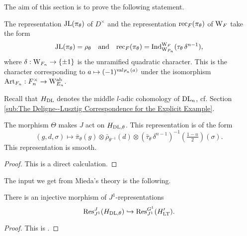 \documentclass[../main.tex]{subfiles}
\begin{document}
The aim of this section is to prove the following statement.
\begin{thm}\label{thm:MainRes1}
  The representation $\mathrm{JL}(\pi_\theta)$ of $D^\times$ and the representation
  $\mathrm{rec}_F(\pi_\theta)$ of $\mathrm W_F$ take the form
  \begin{equation*}
    \mathrm{JL}(\pi_\theta) = \rho_{\theta}
    \quad \text{and} \quad \mathrm{rec}_F(\pi_\theta) = \mathrm{Ind}_{\mathrm W_{F_n}}^{\mathrm W_F} 
    (\tau_\theta \, \delta^{n-1}),
  \end{equation*}
  where $\delta: \mathrm W_{F_n} \to \{\pm 1\}$ is the unramified quadratic
  character. This is the character corresponding to $a \mapsto
  (-1)^{\mathrm{val}_{F_n}(a)}$ under the isomorphism $\mathrm{Art}_{F_n}: F_n^\times \to
  \mathrm W_{E_n}^{\mathrm{ab}}$. 
\end{thm}


Recall that $H_{\mathrm{DL}}$ denotes the middle $l$-adic cohomology of 
$\mathrm{DL}_n$, cf. Section \ref{sub:The Deligne--Lusztig Correspondence for the
Explicit Example}.
\begin{lem}
  The morphism $\Theta$ makes $J$ act on ${H}_{\mathrm{DL},\theta}$. This representation is 
  of the form 
  \begin{equation*}
    (g,d,\sigma) \mapsto \bar \pi_\theta(g) \otimes \bar \rho_{\theta^{-1}}(d)
    \otimes \left(\bar \tau_\theta \, \delta^{n-1}\right)^{-1}(\tfrac{1-n}2)(\sigma).
  \end{equation*}
  This representation is smooth.
\begin{proof}
  This is a direct calculation.
\end{proof}
\end{lem}

The input we get from Mieda's theory is the following.
\begin{prop}\label{prop:J1EquivInjMor}
  There is an injective morphism of  $J^1$-representations
  \begin{equation*} 
    \mathrm{Res}_{J^1}^J( H_{\mathrm{DL},\theta} ) \hookrightarrow \mathrm{Res}_{J^1}^{G^1}( H'_{\mathrm{LT}}).
  \end{equation*}
  \begin{proof}
    This is \cite[Proposition 5.11]{mieda2016geometric}. 
  \end{proof}
\end{prop}
\end{document}

